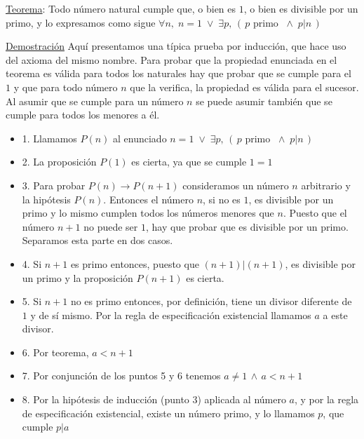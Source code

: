 \rightline{$\Box$}

\underline{Teorema}: Todo número natural cumple que, o bien es $1$, o bien es divisible por un primo, y lo expresamos como sigue  $\forall n,\;   n=1 \; \vee \; \exists p,\, (\, p \text{ primo } \; \wedge \;  p|n\, )$

\underline{Demostración} Aquí presentamos una típica prueba por inducción, que hace uso del axioma del mismo nombre. Para probar que la propiedad enunciada en el teorema es válida para todos los naturales hay que probar que se cumple para el $1$ y que para todo número $n$ que la verifica, la propiedad es válida para el sucesor. Al asumir que se cumple para un número $n$ se puede asumir también que se cumple para todos los menores a él.

\begin{itemize}
	
\item 1. Llamamos $P (n)$ al enunciado $n=1 \; \vee \; \exists p,\, (\, p \text{ primo } \; \wedge \;  p|n \,)$

\item 2. La proposición $P (1)$ es cierta, ya que se cumple $1 = 1$ 

\item 3. Para probar $P (n) \to  P (n + 1)$ consideramos un número $n$ arbitrario y la hipótesis $P (n)$. Entonces el número $n$, si no es $1$, es divisible por un primo y lo mismo cumplen todos los números menores que $n$. Puesto que el número $n+1$ no puede ser $1$, hay que probar que es divisible por un primo. Separamos esta parte en dos casos. 

\item 4. Si $n + 1$ es primo entonces, puesto que $(n + 1)|(n + 1)$, es divisible por un primo y la proposición $P (n + 1)$ es cierta. 

\item 5. Si $n + 1$ no es primo entonces, por definición, tiene un divisor diferente de $1$ y de sí mismo. Por la regla de especificación existencial llamamos $a$ a este divisor.

\item 6. Por teorema, $a < n+1$

\item 7. Por conjunción de los puntos 5 y 6 tenemos  $a  \neq 1 \, \wedge \, a<n+1$

\item 8. Por la hipótesis de inducción (punto 3) aplicada al número $a$, y por la regla de especificación existencial, existe un número primo, y lo llamamos $p$, que cumple $p|a$


\end{itemize}

